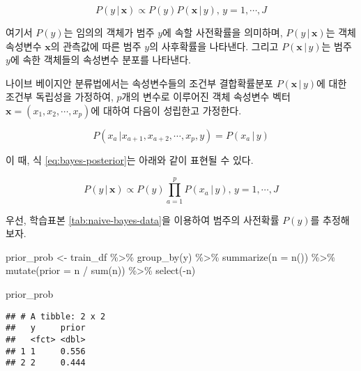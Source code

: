 \documentclass[
]{book}
\newenvironment{Shaded}{\begin{snugshade}}{\end{snugshade}}
\newcommand{\AttributeTok}[1]{\textcolor[rgb]{0.77,0.63,0.00}{#1}}
\newcommand{\FunctionTok}[1]{\textcolor[rgb]{0.00,0.00,0.00}{#1}}
\newcommand{\NormalTok}[1]{#1}
\newcommand{\OtherTok}[1]{\textcolor[rgb]{0.56,0.35,0.01}{#1}}
\newcommand{\SpecialCharTok}[1]{\textcolor[rgb]{0.00,0.00,0.00}{#1}}
\begin{document}
\begin{equation}
P(y \, | \, \mathbf{x}) \propto P(y) P(\mathbf{x} \, | \, y), \, y = 1, \cdots, J \label{eq:bayes-posterior}
\end{equation}

여기서 \(P(y)\)는 임의의 객체가 범주 \(y\)에 속할 사전확률을 의미하며, \(P(y \, | \, \mathbf{x})\)는 객체 속성변수 \(\mathbf{x}\)의 관측값에 따른 범주 \(y\)의 사후확률을 나타낸다. 그리고 \(P(\mathbf{x} \, | \, y)\)는 범주 \(y\)에 속한 객체들의 속성변수 분포를 나타낸다.

나이브 베이지안 분류법에서는 속성변수들의 조건부 결합확률분포 \(P(\mathbf{x} \, | \, y)\)에 대한 조건부 독립성을 가정하여, \(p\)개의 변수로 이루어진 객체 속성변수 벡터 \(\mathbf{x} = (x_1, x_2, \cdots, x_p)\)에 대하여 다음이 성립한고 가정한다.

\begin{equation*}
P(x_a \, | x_{a + 1}, x_{a + 2}, \cdots, x_p, y) = P(x_a \,|\, y)
\end{equation*}

이 때, 식 \eqref{eq:bayes-posterior}는 아래와 같이 표현될 수 있다.

\begin{equation}
P(y \, | \, \mathbf{x}) \propto P(y) \prod_{a = 1}^{p} P(x_a \, | \, y), \, y = 1, \cdots, J \label{eq:naive-bayes-posterior}
\end{equation}

우선, 학습표본 \ref{tab:naive-bayes-data}을 이용하여 범주의 사전확률 \(P(y)\)를 추정해보자.

\begin{Shaded}
\begin{Highlighting}[]
\NormalTok{prior\_prob }\OtherTok{\textless{}{-}}\NormalTok{ train\_df }\SpecialCharTok{\%\textgreater{}\%}
  \FunctionTok{group\_by}\NormalTok{(y) }\SpecialCharTok{\%\textgreater{}\%}
  \FunctionTok{summarize}\NormalTok{(}\AttributeTok{n =} \FunctionTok{n}\NormalTok{()) }\SpecialCharTok{\%\textgreater{}\%}
  \FunctionTok{mutate}\NormalTok{(}\AttributeTok{prior =}\NormalTok{ n }\SpecialCharTok{/} \FunctionTok{sum}\NormalTok{(n)) }\SpecialCharTok{\%\textgreater{}\%}
  \FunctionTok{select}\NormalTok{(}\SpecialCharTok{{-}}\NormalTok{n)}

\NormalTok{prior\_prob}
\end{Highlighting}
\end{Shaded}

\begin{verbatim}
## # A tibble: 2 x 2
##   y     prior
##   <fct> <dbl>
## 1 1     0.556
## 2 2     0.444
\end{verbatim}
\end{document}
